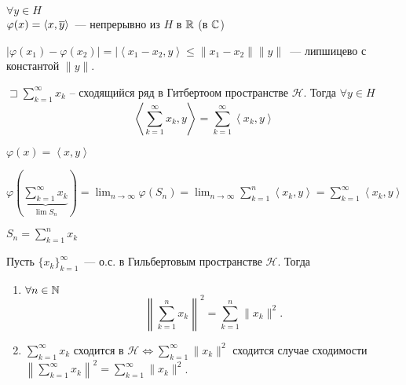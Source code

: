 \begin{note}
    $\forall y \in H$\\
    $\varphi(x) = \left< x, \overline{y} \right>$~--- непрерывно из $H$ в $\mathbb{R}$ (в $\mathbb{C}$)

    $| \varphi(x_1) - \varphi(x_2)| = |\left< x_1 - x_2 , y \right> \leqslant \| x_1 - x_2\| \|y\|$~--- липшицево с константой $\|y\|$.
\end{note}

\begin{note}
    $\sqsupset \sum_{k=1}^{\infty } x_k $ -- сходящийся ряд в Гитбертоом пространстве $\mathcal H$. Тогда $\forall y\in H$
    \[ \left< \sum_{k=1}^{\infty } x_k, y \right> = \sum_{k=1}^{\infty }\left<x_k, y \right> \]
\end{note}

\begin{note}
    $\varphi(x) = \left<x,y \right>$

    $\varphi\left(\underbrace{\sum_{k=1}^{\infty } x_k }_{\lim S_n } \right) = \lim_{n \to \infty} \varphi(S_n) = \lim_{n \to \infty} \sum_{k=1}^{n } \left<x_k, y \right> = \sum_{k=1}^{\infty } \left<x_k, y \right> $

    $S_n = \sum_{k=1}^{n} x_k$
\end{note}

\begin{theorem}
    [<<Пифагора>>]

    Пусть $\{ x_k\}_{k=1}^\infty$~--- о.с. в Гильбертовым пространстве $\mathcal{H}$. Тогда

    \begin{enumerate}
        \item $\forall n \in \mathbb{N}$
        \[ \left\|\sum_{k=1}^n x_k \right\|^2 = \sum_{k =1}^n \|x_k\|^2. \]
        \item $\sum_{k=1}^\infty x_k$ сходится в $\mathcal{H} \iff \sum_{k =1 }^\infty \|x_k\|^2$ сходится
        случае сходимости $\left\| \sum_{k=1}^\infty x_k \right\|^2 = \sum_{k=1}^\infty \|x_k\|^2$.
    \end{enumerate}
\end{theorem}

